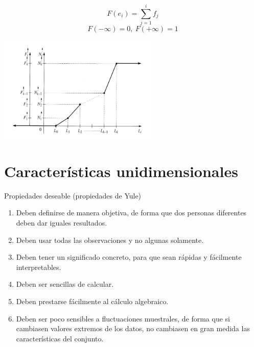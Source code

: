 \documentclass[]{article}
\begin{document}
\begin{itemize}
		\begin{minipage}[t]{.45\linewidth}
			\raggedleft
			\vspace*{0pt}
			\begin{equation*}
				F(e_i) = \sum_{j = 1}^i f_j
			\end{equation*}
			\begin{equation*}
				F(-\infty) = 0, ~ F(+\infty) = 1
			\end{equation*}
		\end{minipage}%
		\begin{minipage}[t]{.45\linewidth}
			\vspace*{0pt}
			\raggedleft
			\begin{center}
				\includegraphics[scale=0.55]{distrib_continua}
			\end{center}
		\end{minipage}
	\end{itemize}

	\newpage

	\section{Características unidimensionales}
	
	Propiedades deseable (propiedades de Yule)
	\begin{enumerate}{}{}
		\item Deben definirse de manera objetiva, de forma que dos personas diferentes deben dar iguales resultados.
		\item Deben usar todas las observaciones y no algunas solamente.
		\item Deben tener un significado concreto, para que sean rápidas y fácilmente interpretables.
		\item Deben ser sencillas de calcular.
		\item Deben prestarse fácilmente al cálculo algebraico.
		\item Deben ser poco sensibles a fluctuaciones muestrales, de forma que si cambiasen valores extremos de los datos, no cambiasen en gran medida las características del conjunto.
	\end{enumerate}
	
\end{document}
